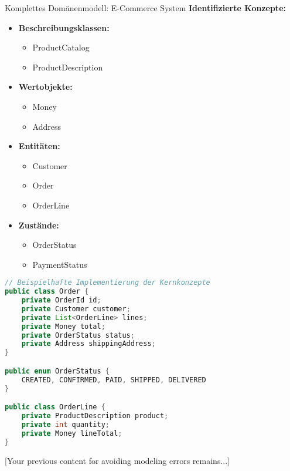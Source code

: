\begin{example}{Komplettes Domänenmodell: E-Commerce System}
\textbf{Identifizierte Konzepte:}
\begin{itemize}
    \item \textbf{Beschreibungsklassen:}
    \begin{itemize}
        \item ProductCatalog
        \item ProductDescription
    \end{itemize}
    
    \item \textbf{Wertobjekte:}
    \begin{itemize}
        \item Money
        \item Address
    \end{itemize}
    
    \item \textbf{Entitäten:}
    \begin{itemize}
        \item Customer
        \item Order
        \item OrderLine
    \end{itemize}
    
    \item \textbf{Zustände:}
    \begin{itemize}
        \item OrderStatus
        \item PaymentStatus
    \end{itemize}
\end{itemize}

\begin{lstlisting}[language=Java]
// Beispielhafte Implementierung der Kernkonzepte
public class Order {
    private OrderId id;
    private Customer customer;
    private List<OrderLine> lines;
    private Money total;
    private OrderStatus status;
    private Address shippingAddress;
}

public enum OrderStatus {
    CREATED, CONFIRMED, PAID, SHIPPED, DELIVERED
}

public class OrderLine {
    private ProductDescription product;
    private int quantity;
    private Money lineTotal;
}
\end{lstlisting}
\end{example}

[Your previous content for avoiding modeling errors remains...]